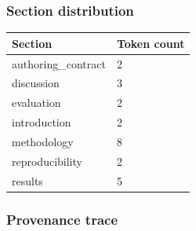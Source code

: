 \documentclass[
]{article}
\newcounter{none} %
\begin{document}
\subsubsection{Section distribution}\label{section-distribution}

{\def\LTcaptype{none} %
\begin{longtable}[]{@{}ll@{}}
\toprule\noalign{}
Section & Token count \\
\midrule\noalign{}
\endhead
\bottomrule\noalign{}
\endlastfoot
authoring\_contract & 2 \\
discussion & 3 \\
evaluation & 2 \\
introduction & 2 \\
methodology & 8 \\
reproducibility & 2 \\
results & 5 \\
\end{longtable}
}

\subsubsection{Provenance trace}\label{provenance-trace}
\end{document}

